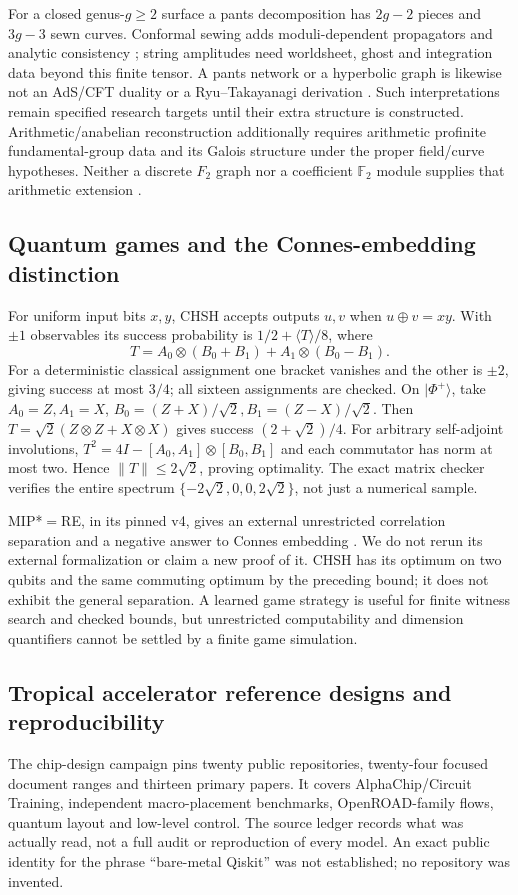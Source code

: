 \documentclass[11pt,oneside,openany]{book}
\theoremstyle{definition}\newtheorem{definition}[theorem]{Definition}
\theoremstyle{remark}\newtheorem{remark}[theorem]{Remark}
\begin{document}
For a closed genus-$g\geq2$ surface a pants decomposition has $2g-2$
pieces and $3g-3$ sewn curves. Conformal sewing adds moduli-dependent
propagators and analytic consistency \cite{LFSegal}; string amplitudes
need worldsheet, ghost and integration data beyond this finite tensor.
A pants network or a hyperbolic graph is likewise not an AdS/CFT duality
or a Ryu--Takayanagi derivation \cite{LFRyu}. Such interpretations remain
specified research targets until their extra structure is constructed.
Arithmetic/anabelian reconstruction additionally requires arithmetic
profinite fundamental-group data and its Galois structure under the proper
field/curve hypotheses. Neither a discrete $F_2$ graph nor a coefficient
$\mathbb F_2$ module supplies that arithmetic extension \cite{LFAnabelian}.

\subsection{Quantum games and the Connes-embedding distinction}
For uniform input bits $x,y$, CHSH accepts outputs $u,v$ when
$u\oplus v=xy$. With $\pm1$ observables its success probability is
$1/2+\langle T\rangle/8$, where
\[
 T=A_0\otimes(B_0+B_1)+A_1\otimes(B_0-B_1).
\]
For a deterministic classical assignment one bracket vanishes and the
other is $\pm2$, giving success at most $3/4$; all sixteen assignments
are checked. On $|\Phi^+\rangle$, take $A_0=Z,A_1=X$,
$B_0=(Z+X)/\sqrt2,B_1=(Z-X)/\sqrt2$. Then
$T=\sqrt2(Z\otimes Z+X\otimes X)$ gives success
$(2+\sqrt2)/4$. For arbitrary self-adjoint involutions,
$T^2=4I-[A_0,A_1]\otimes[B_0,B_1]$ and each commutator has norm at most
two. Hence $\|T\|\leq2\sqrt2$, proving optimality.
The exact matrix checker verifies the entire spectrum
$\{-2\sqrt2,0,0,2\sqrt2\}$, not just a numerical sample.

MIP*$=$RE, in its pinned v4, gives an external unrestricted correlation
separation and a negative answer to Connes embedding \cite{LFMIP}.
We do not rerun its external formalization or claim a new proof of it.
CHSH has its optimum on two qubits and the same commuting optimum by
the preceding bound; it does not exhibit the general separation.
A learned game strategy is useful for finite witness search and checked
bounds, but unrestricted computability and dimension quantifiers cannot
be settled by a finite game simulation.

\subsection{Tropical accelerator reference designs and reproducibility}
The chip-design campaign pins twenty public repositories, twenty-four
focused document ranges and thirteen primary papers. It covers
AlphaChip/Circuit Training, independent macro-placement benchmarks,
OpenROAD-family flows, quantum layout and low-level control.
The source ledger records what was actually read, not a full audit or
reproduction of every model. An exact public identity for the phrase
``bare-metal Qiskit'' was not established; no repository was invented.
\end{document}
